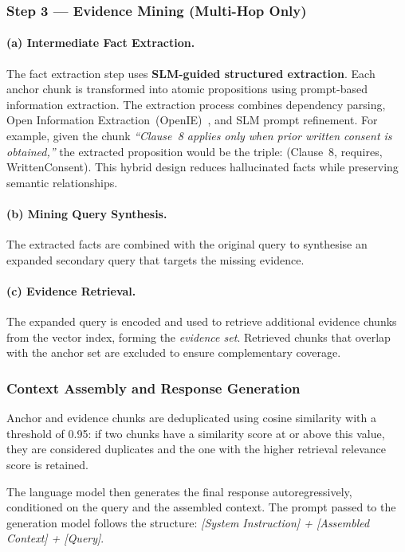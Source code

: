 \documentclass[12pt,a4paper]{article}
\begin{document}
\subsubsection{Step 3 --- Evidence Mining (Multi-Hop Only)}

\paragraph{(a) Intermediate Fact Extraction.}
The fact extraction step uses \textbf{SLM-guided structured extraction}.
Each anchor chunk is transformed into atomic propositions using prompt-based
information extraction. The extraction process combines dependency parsing,
Open Information Extraction~(OpenIE)~\cite{stanovsky2018openie}, and SLM
prompt refinement. For example, given the chunk \textit{``Clause~8 applies
only when prior written consent is obtained,''} the extracted proposition
would be the triple: (Clause~8, requires, WrittenConsent). This hybrid
design reduces hallucinated facts while preserving semantic relationships.

\paragraph{(b) Mining Query Synthesis.}
The extracted facts are combined with the original query to synthesise an
expanded secondary query that targets the missing evidence.

\paragraph{(c) Evidence Retrieval.}
The expanded query is encoded and used to retrieve additional evidence chunks
from the vector index, forming the \emph{evidence set}. Retrieved chunks
that overlap with the anchor set are excluded to ensure complementary
coverage.

\subsubsection{Context Assembly and Response Generation}

Anchor and evidence chunks are deduplicated using cosine similarity with a
threshold of 0.95: if two chunks have a similarity score at or above this
value, they are considered duplicates and the one with the higher retrieval
relevance score is retained.

The language model then generates the final response autoregressively,
conditioned on the query and the assembled context. The prompt passed to
the generation model follows the structure: \textit{[System Instruction]
+ [Assembled Context] + [Query]}.
\end{document}
